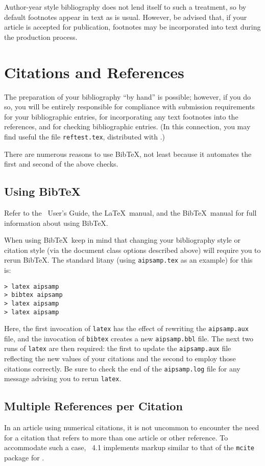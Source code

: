 \documentclass[%
 reprint,%
 amssymb, amsmath,%
 aip,cha,%
]{revtex4-1}
\begin{document}
Author-year style bibliography does not lend itself to such a treatment, 
so by default footnotes appear in text as is usual. 
However, be advised that, if your article is accepted for publication,
footnotes may be incorporated into text during the production process.

\section{Citations and References}\label{sec:endnotes}

The preparation of your bibliography ``by hand'' is possible; 
however, if you do so, 
you will be entirely responsible 
for compliance with submission requirements for your bibliographic entries, 
for incorporating any text footnotes into the references, 
and for checking bibliographic entries. 
(In this connection, you may find useful the file \texttt{reftest.tex}, distributed with \revtex.)

There are numerous reasons to use Bib\TeX, not least because it automates the first and second of the above checks. 

\subsection{\label{sec:use-bib}Using Bib\protect\TeX}

Refer to the \revtex\ User's Guide, the \LaTeX\ manual, and the Bib\TeX\ manual
for full information about using Bib\TeX. 

When using Bib\TeX\, keep in mind that changing your bibliography style or citation style
(via the document class options described above) will require you to rerun Bib\TeX.
The standard litany (using \texttt{aipsamp.tex} as an example) for this is:
\begin{verbatim}
> latex aipsamp
> bibtex aipsamp
> latex aipsamp
> latex aipsamp
\end{verbatim}
Here, the first invocation of \texttt{latex} has the effect of rewriting the
\texttt{aipsamp.aux} file,
and the invocation of \texttt{bibtex} creates a new \texttt{aipsamp.bbl} file. 
The next two runs of \texttt{latex} are then required: 
the first to update the \texttt{aipsamp.aux} file reflecting the new values of your citations
and the second to employ those citations correctly. 
Be sure to check the end of the \texttt{aipsamp.log} file for any message advising you to 
rerun \texttt{latex}. 

\subsection{Multiple References per Citation}
In an article using numerical citations, 
it is not uncommon to encounter the need for a citation 
that refers to more than one article or other reference. 
To accommodate such a case, \revtex~4.1 implements markup similar to that of the 
\texttt{mcite} package for \LaTeXe. 
\end{document}
